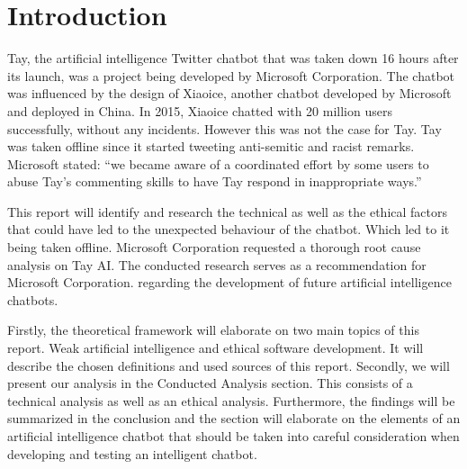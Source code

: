 \chapter{Introduction}

Tay, the artificial intelligence Twitter chatbot that was taken down 16 hours after its launch, was a project being developed by Microsoft Corporation. The chatbot was influenced by the design of Xiaoice, another chatbot developed by Microsoft and deployed in China. In 2015, Xiaoice chatted with 20 million users successfully, without any incidents. However this was not the case for Tay. Tay was taken offline since it started tweeting anti-semitic and racist remarks. Microsoft stated: “we became aware of a coordinated effort by some users to abuse Tay’s commenting skills to have Tay respond in inappropriate ways.”\cite{microsoftstatement}

This report will identify and research the technical as well as the ethical factors that could have led to the unexpected behaviour of the chatbot. Which led to it being taken offline. Microsoft Corporation requested a thorough root cause analysis on Tay AI. The conducted research serves as a recommendation for Microsoft Corporation. regarding the development of future artificial intelligence chatbots. 

Firstly, the theoretical framework will elaborate on two main topics of this report. Weak artificial intelligence and ethical software development. It will describe the chosen definitions and used sources of this report. Secondly, we will present our analysis in the Conducted Analysis section. This consists of a technical analysis as well as an ethical analysis. Furthermore, the findings will be summarized in the conclusion and the section will elaborate on the elements of an artificial intelligence chatbot that should be taken into careful consideration when developing and testing an intelligent chatbot. 


